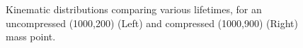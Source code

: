 \begin{figure}[h!]
\begin{center}
     \\
     ~
    \caption{Kinematic distributions comparing various lifetimes, for an uncompressed (1000,200) (Left)
        and compressed (1000,900) (Right) mass point.}
    \label{fig:T1qqqqLLvsT1qqqqLL}
  \end{center}
\end{figure}

